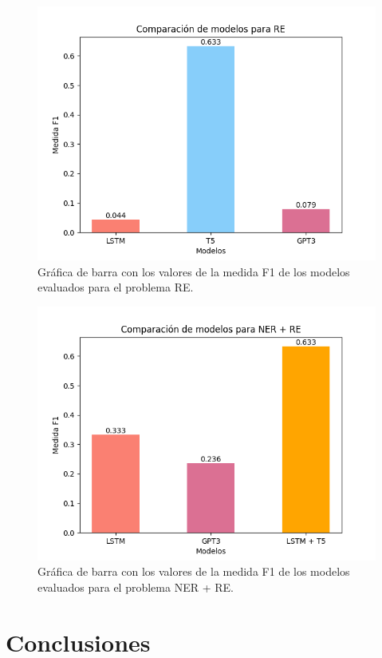 \documentclass[10pt]{article} %
\begin{document}
		\begin{figure}[htb]
		\centering
		\includegraphics[scale=0.6]{../images/RE_bar}
		\caption{Gr\'afica de barra con los valores de la medida F1 de los modelos evaluados para el problema RE.}
		\label{RE}
	\end{figure}

	
	\begin{figure}[htb]
		\centering
		\includegraphics[scale=0.6]{../images/NER_RE_bar}
		\caption{Gr\'afica de barra con los valores de la medida F1 de los modelos evaluados para el problema NER + RE.}
		\label{NR}
	\end{figure}
	
	\section{Conclusiones}
	
\end{document}
